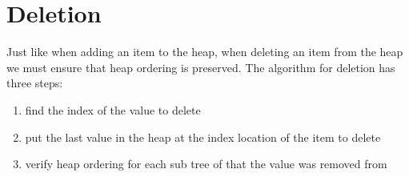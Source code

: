 \section{Deletion}
Just like when adding an item to the heap, when deleting an item from the heap we must ensure that heap ordering is preserved. The algorithm for deletion has three steps:

\begin{enumerate}
\item find the index of the value to delete
\item put the last value in the heap at the index location of the item to delete 
\item verify heap ordering for each sub tree of that the value was removed from
\end{enumerate}

